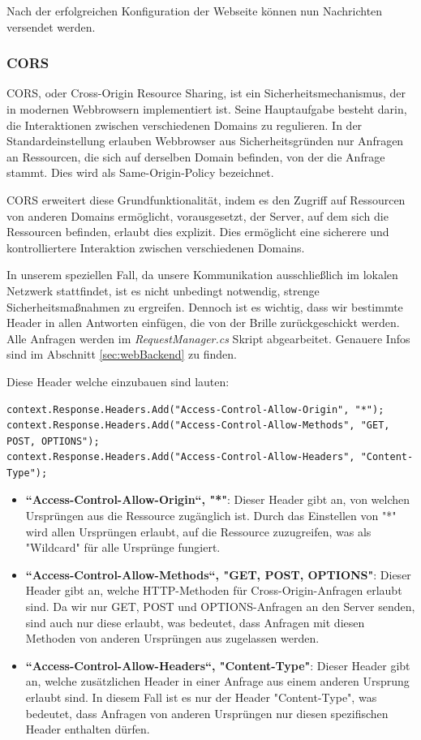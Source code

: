 Nach der erfolgreichen Konfiguration der Webseite können nun Nachrichten versendet werden.

\subsubsection{\label{sec:cors}CORS}
CORS, oder Cross-Origin Resource Sharing, ist ein Sicherheitsmechanismus, der in modernen Webbrowsern implementiert ist. Seine Hauptaufgabe besteht darin, die Interaktionen zwischen verschiedenen Domains zu regulieren. In der Standardeinstellung erlauben Webbrowser aus Sicherheitsgründen nur Anfragen an Ressourcen, die sich auf derselben Domain befinden, von der die Anfrage stammt. Dies wird als Same-Origin-Policy bezeichnet.

CORS erweitert diese Grundfunktionalität, indem es den Zugriff auf Ressourcen von anderen Domains ermöglicht, vorausgesetzt, der Server, auf dem sich die Ressourcen befinden, erlaubt dies explizit. Dies ermöglicht eine sicherere und kontrolliertere Interaktion zwischen verschiedenen Domains. %

In unserem speziellen Fall, da unsere Kommunikation ausschließlich im lokalen Netzwerk stattfindet, ist es nicht unbedingt notwendig, strenge Sicherheitsmaßnahmen zu ergreifen. Dennoch ist es wichtig, dass wir bestimmte Header in allen Antworten einfügen, die von der Brille zurückgeschickt werden. Alle Anfragen werden im \textit{RequestManager.cs} Skript abgearbeitet. Genauere Infos sind im Abschnitt \ref{sec:webBackend} zu finden.

Diese Header welche einzubauen sind lauten:

\begin{lstlisting}[style=csharp label=code:CORS anfragen]
context.Response.Headers.Add("Access-Control-Allow-Origin", "*");
context.Response.Headers.Add("Access-Control-Allow-Methods", "GET, POST, OPTIONS");
context.Response.Headers.Add("Access-Control-Allow-Headers", "Content-Type");
\end{lstlisting}

\begin{itemize}
\item \textbf{``Access-Control-Allow-Origin``, "*"}: Dieser Header gibt an, von welchen Ursprüngen aus die Ressource zugänglich ist. Durch das Einstellen von "*" wird allen Ursprüngen erlaubt, auf die Ressource zuzugreifen, was als "Wildcard" für alle Ursprünge fungiert.
\item \textbf{``Access-Control-Allow-Methods``, "GET, POST, OPTIONS"}: Dieser Header gibt an, welche HTTP-Methoden für Cross-Origin-Anfragen erlaubt sind. Da wir nur GET, POST und OPTIONS-Anfragen an den Server senden, sind auch nur diese erlaubt, was bedeutet, dass Anfragen mit diesen Methoden von anderen Ursprüngen aus zugelassen werden.
\item \textbf{``Access-Control-Allow-Headers``, "Content-Type"}: Dieser Header gibt an, welche zusätzlichen Header in einer Anfrage aus einem anderen Ursprung erlaubt sind. In diesem Fall ist es nur der Header "Content-Type", was bedeutet, dass Anfragen von anderen Ursprüngen nur diesen spezifischen Header enthalten dürfen.
\end{itemize}

